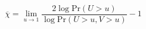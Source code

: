 \documentclass[a5paper]{article}
\begin{document}
\LARGE
\pagestyle{empty}

\[
\overline{\chi}=\lim_{u\rightarrow 1}\frac{2\log\mathrm{Pr}(U>u)}{\log\mathrm{Pr}(U>u,V>u)}-1
\]
\end{document}
